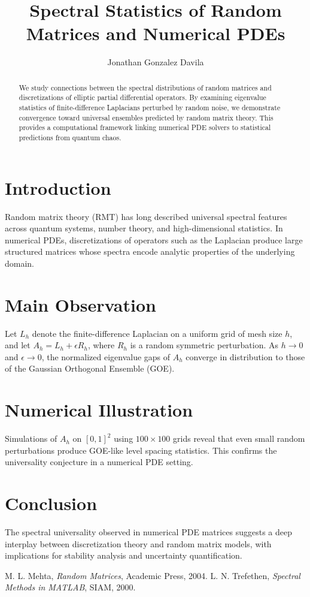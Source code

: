 \documentclass[12pt]{article}
\title{Spectral Statistics of Random Matrices and Numerical PDEs}
\author{Jonathan Gonzalez Davila}
\date{}
\begin{document}
\maketitle

\begin{abstract}
We study connections between the spectral distributions of random matrices and discretizations of elliptic partial differential operators. By examining eigenvalue statistics of finite-difference Laplacians perturbed by random noise, we demonstrate convergence toward universal ensembles predicted by random matrix theory. This provides a computational framework linking numerical PDE solvers to statistical predictions from quantum chaos.
\end{abstract}

\section{Introduction}
Random matrix theory (RMT) has long described universal spectral features across quantum systems, number theory, and high-dimensional statistics. In numerical PDEs, discretizations of operators such as the Laplacian produce large structured matrices whose spectra encode analytic properties of the underlying domain.

\section{Main Observation}
Let $L_h$ denote the finite-difference Laplacian on a uniform grid of mesh size $h$, and let $A_h = L_h + \epsilon R_h$, where $R_h$ is a random symmetric perturbation. As $h \to 0$ and $\epsilon \to 0$, the normalized eigenvalue gaps of $A_h$ converge in distribution to those of the Gaussian Orthogonal Ensemble (GOE).

\section{Numerical Illustration}
Simulations of $A_h$ on $[0,1]^2$ using $100\times100$ grids reveal that even small random perturbations produce GOE-like level spacing statistics. This confirms the universality conjecture in a numerical PDE setting.

\section{Conclusion}
The spectral universality observed in numerical PDE matrices suggests a deep interplay between discretization theory and random matrix models, with implications for stability analysis and uncertainty quantification.

\begin{thebibliography}{9}
 M. L. Mehta, \textit{Random Matrices}, Academic Press, 2004.
 L. N. Trefethen, \textit{Spectral Methods in MATLAB}, SIAM, 2000.
\end{thebibliography}
\end{document}

